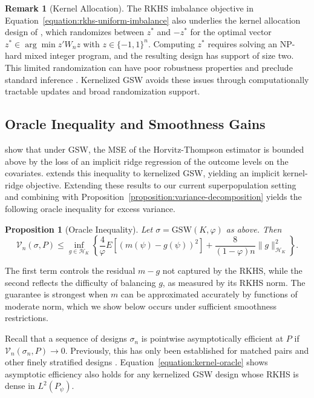 \documentclass[letterpaper,12pt]{article}
\newtheorem{prop}[thm]{Proposition}
\theoremstyle{definition}
\newtheorem{remark}[thm]{Remark}
\numberwithin{equation}{section}
\newcommand{\mc}{\mathcal}
\newcommand{\norm}[1]{\lVert#1\rVert}
\begin{document}
\begin{remark}[Kernel Allocation]
The RKHS imbalance objective in Equation~\eqref{equation:rkhs-uniform-imbalance} also underlies the kernel allocation design of \citet{kallus2018}, which randomizes between $z^*$ and $-z^*$ for the optimal vector $z^*\in\arg\min z'W_nz$ with $z\in\{-1,1\}^n$.
Computing $z^*$ requires solving an NP-hard mixed integer program, and the resulting design has support of size two.
This limited randomization can have poor robustness properties and preclude standard inference \citep{kallus2021}.
Kernelized GSW avoids these issues through computationally tractable updates and broad randomization support.
\end{remark}

\subsection{Oracle Inequality and Smoothness Gains}\label{subsection:kernel-oracle-rates}

\citet{harshaw2024gsw} show that under GSW, the MSE of the Horvitz-Thompson estimator is bounded above by the loss of an implicit ridge regression of the outcome levels on the covariates.
\citet{harshaw2021dissertation} extends this inequality to kernelized GSW, yielding an implicit kernel-ridge objective.
Extending these results to our current superpopulation setting and combining with Proposition~\ref{proposition:variance-decomposition} yields the following oracle inequality for excess variance.

\begin{prop}[Oracle Inequality]\label{proposition:kernel-oracle}
Let $\sigma=\mathrm{GSW}(K,\varphi)$ as above.
Then
\begin{equation}\label{equation:kernel-oracle}
\mc V_n(\sigma,P) \leq \inf_{g\in\mc H_{K}} \left\{ \frac4\varphi E\left[(m(\psi)-g(\psi))^2\right] + \frac8{(1-\varphi)n} \norm{g}_{\mc H_{K}}^2 \right\}.
\end{equation}
\end{prop}

The first term controls the residual $m-g$ not captured by the RKHS, while the second reflects the difficulty of balancing $g$, as measured by its RKHS norm.
The guarantee is strongest when $m$ can be approximated accurately by functions of moderate norm, which we show below occurs under sufficient smoothness restrictions.

Recall that a sequence of designs $\sigma_n$ is pointwise asymptotically efficient at $P$ if $\mc V_n(\sigma_n,P)\to0$.
Previously, this has only been established for matched pairs and other finely stratified designs \citep{bai2021inference,bai2023efficiency}.
Equation~\eqref{equation:kernel-oracle} shows asymptotic efficiency also holds for any kernelized GSW design whose RKHS is dense in $L^2(P_\psi)$.
\end{document}
